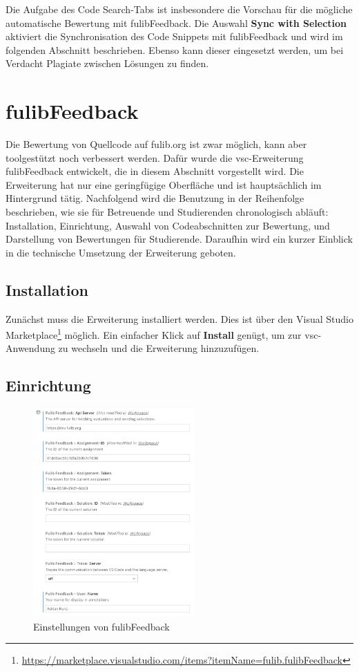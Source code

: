 Die Aufgabe des Code Search-Tabs ist insbesondere die Vorschau für die mögliche automatische Bewertung mit fulibFeedback.
Die Auswahl \textbf{Sync with Selection} aktiviert die Synchronisation des Code Snippets mit fulibFeedback und wird im folgenden Abschnitt beschrieben.
Ebenso kann dieser eingesetzt werden, um bei Verdacht Plagiate zwischen Lösungen zu finden.

\section{fulibFeedback}\label{sec:fulibFeedback}

Die Bewertung von Quellcode auf fulib.org ist zwar möglich, kann aber toolgestützt noch verbessert werden.
Dafür wurde die \ac{vsc}-Erweiterung fulibFeedback entwickelt, die in diesem Abschnitt vorgestellt wird.
Die Erweiterung hat nur eine geringfügige Oberfläche und ist hauptsächlich im Hintergrund tätig.
Nachfolgend wird die Benutzung in der Reihenfolge beschrieben, wie sie für Betreuende und Studierenden chronologisch abläuft:
Installation, Einrichtung, Auswahl von Codeabschnitten zur Bewertung, und Darstellung von Bewertungen für Studierende.
Daraufhin wird ein kurzer Einblick in die technische Umsetzung der Erweiterung geboten.

\subsection{Installation}

Zunächst muss die Erweiterung installiert werden.
Dies ist über den Visual Studio Marketplace\footnote{
    \url{https://marketplace.visualstudio.com/items?itemName=fulib.fulibFeedback}
} möglich.
Ein einfacher Klick auf \textbf{Install} genügt, um zur \ac{vsc}-Anwendung zu wechseln und die Erweiterung hinzuzufügen.

\subsection{Einrichtung}

\begin{figure}
    \centering
    \includegraphics[width=0.55\textwidth]{images/fulibFeedback-settings.png}
    \caption{Einstellungen von fulibFeedback}
    \label{fig:fulibFeedback-settings}
\end{figure}

